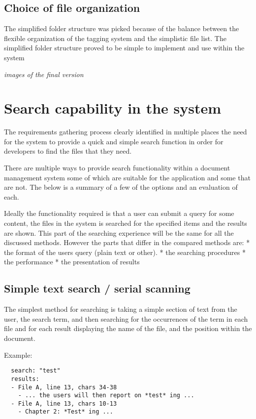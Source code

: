 \subsection{Choice of file
organization}\label{choice-of-file-organization}

The simplified folder structure was picked because of the balance
between the flexible organization of the tagging system and the
simplistic file list. The simplified folder structure proved to be
simple to implement and use within the system

\emph{images of the final version}

\section{Search capability in the
system}\label{search-capability-in-the-system}

The requirements gathering process clearly identified in multiple places
the need for the system to provide a quick and simple search function in
order for developers to find the files that they need.

There are multiple ways to provide search functionality within a
document management system some of which are suitable for the
application and some that are not. The below is a summary of a few of
the options and an evaluation of each.

Ideally the functionality required is that a user can submit a query for
some content, the files in the system is searched for the specified
items and the results are shown. This part of the searching experience
will be the same for all the discussed methods. However the parts that
differ in the compared methods are: * the format of the users query
(plain text or other). * the searching procedures * the performance *
the presentation of results

\subsection{Simple text search / serial
scanning}\label{simple-text-search-serial-scanning}

The simplest method for searching is taking a simple section of text
from the user, the search term, and then searching for the occurrences
of the term in each file and for each result displaying the name of the
file, and the position within the document.

Example:

\begin{verbatim}
  search: "test"
  results:
  - File A, line 13, chars 34-38
    - ... the users will then report on *test* ing ...
  - File A, line 13, chars 10-13
    - Chapter 2: *Test* ing ...
\end{verbatim}

